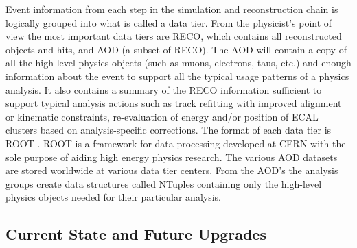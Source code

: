 Event information from each step in the simulation and reconstruction chain is logically grouped into what is called a data tier\cite{CMScomp1}. From the physicist's point of view the most important data tiers are RECO, which contains all reconstructed objects and hits, and AOD (a subset of RECO). The AOD will contain a copy of all the high-level physics objects (such as muons, electrons, taus, etc.) and enough information about the event to support all the typical usage patterns of a physics analysis. It also contains a summary of the RECO information sufficient to support typical analysis actions such as track refitting with improved alignment or kinematic constraints, re-evaluation of energy and/or position of ECAL clusters based on analysis-specific corrections. The format of each data tier is ROOT \cite{ROOT}. ROOT is a framework for data processing developed at CERN with the sole purpose of aiding high energy physics research. The various AOD datasets are stored worldwide at various data tier centers. From the AOD's the analysis groups create data structures called NTuples containing only the high-level physics objects needed for their particular analysis. 

\subsection{Current State and Future Upgrades}



